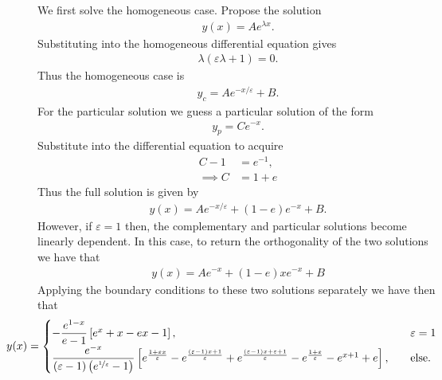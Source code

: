 \documentclass[12pt]{article}
\begin{document}
We first solve the homogeneous case. Propose the solution
\begin{align}
	y(x) = Ae^{\lambda x}.
\end{align}
Substituting into the homogeneous differential equation gives
\begin{align}
	\lambda(\varepsilon\lambda + 1) = 0.
\end{align}
Thus the homogeneous case is
\begin{align}
	y_{c} = Ae^{-x/\varepsilon} + B.
\end{align}
For the particular solution we guess a particular solution of the form
\begin{align}
	y_{p} = Ce^{-x}.
\end{align}
Substitute into the differential equation to acquire
\begin{subequations}
	\begin{align}
		C-1 &= e^{-1},\\
		\implies C &= 1+e
	\end{align}
\end{subequations}
Thus the full solution is given by
\begin{align}
	y(x) = Ae^{-x/\varepsilon} + (1-e)e^{-x} + B.
\end{align}
However, if $\varepsilon = 1$ then, the complementary and particular solutions become linearly dependent. In this case, to return the orthogonality of the two solutions we have that
\begin{align}
	y(x) = Ae^{-x} + (1-e)xe^{-x} + B
\end{align}
Applying the boundary conditions to these two solutions separately we have then that
\begin{align}
    \hspace{-1cm}y(x) =
    \begin{cases}
	    -\dfrac{e^{1-x}}{e-1}\left[e^{x}+x-ex-1\right],&\quad \varepsilon = 1\\
	    \dfrac{e^{-x}}{(\varepsilon-1) \left(e^{\nicefrac{1}{\varepsilon}}-1\right)} \left[ e^{\frac{1+\varepsilon x}{\varepsilon}}-e^{\frac{(\varepsilon-1)x+1}{\varepsilon}}+e^{\frac{(\varepsilon-1)x+\varepsilon+1}{\varepsilon}}-e^{\frac{1+\varepsilon}{\varepsilon}}-e^{x+1}+e
	    \right],&\quad \mathrm{else}.\\
    \end{cases}
\end{align}
\end{document}
